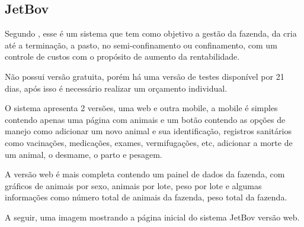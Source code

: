 \documentclass[12pt]{article}
\begin{document}




\newpage


\subsection{JetBov}

Segundo , esse é um sistema que tem como objetivo a gestão da fazenda, da cria até a terminação, a pasto, no semi-confinamento ou confinamento, com um controle de custos com o propósito de aumento da rentabilidade. 

Não possui versão gratuita, porém há uma versão de testes disponível por 21 dias, após isso é necessário realizar um orçamento individual.

O sistema apresenta 2 versões, uma web e outra mobile, a mobile é simples contendo apenas uma página com animais e um botão contendo as opções de manejo como adicionar um novo animal e sua identificação, registros sanitários como vacinações, medicações, exames, vermifugações, etc, adicionar a morte de um animal, o desmame, o parto e pesagem.

A versão web é mais completa contendo um painel de dados da fazenda, com gráficos de animais por sexo, animais por lote, peso por lote e algumas informações como número total de animais da fazenda, peso total da fazenda. 

A seguir, uma imagem mostrando a página inicial do sistema JetBov versão web.
\end{document}
